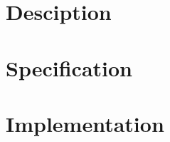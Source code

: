 \documentclass[10pt,a4paper]{article}
\begin{document}
\chapter{Desciption}

\chapter{Specification}

\chapter{Implementation}
\end{document}

